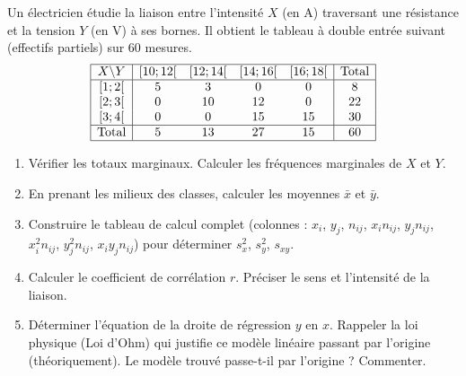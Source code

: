 \documentclass[11pt]{article}
\begin{document}
\begin{exercice}
Un électricien étudie la liaison entre l'intensité $X$ (en A) traversant une résistance et la tension $Y$ (en V) à ses bornes. Il obtient le tableau à double entrée suivant (effectifs partiels) sur 60 mesures.
\[
\begin{array}{|c|cccc|c|}\hline
X \backslash Y & [10;12[ & [12;14[ & [14;16[ & [16;18[ & \text{Total} \\ \hline
\relax [1;2[ & 5 & 3 & 0 & 0 & 8 \\
\relax [2;3[ & 0 & 10 & 12 & 0 & 22 \\
\relax [3;4[ & 0 & 0 & 15 & 15 & 30 \\ \hline
\text{Total} & 5 & 13 & 27 & 15 & 60 \\ \hline
\end{array}
\]
\begin{enumerate}
\item Vérifier les totaux marginaux. Calculer les fréquences marginales de $X$ et $Y$.
\item En prenant les milieux des classes, calculer les moyennes $\bar{x}$ et $\bar{y}$.
\item Construire le tableau de calcul complet (colonnes : $x_i$, $y_j$, $n_{ij}$, $x_i n_{ij}$, $y_j n_{ij}$, $x_i^2 n_{ij}$, $y_j^2 n_{ij}$, $x_i y_j n_{ij}$) pour déterminer $s_x^2$, $s_y^2$, $s_{xy}$.
\item Calculer le coefficient de corrélation $r$. Préciser le sens et l'intensité de la liaison.
\item Déterminer l'équation de la droite de régression $y$ en $x$. Rappeler la loi physique (Loi d'Ohm) qui justifie ce modèle linéaire passant par l'origine (théoriquement). Le modèle trouvé passe-t-il par l'origine ? Commenter.
\end{enumerate}
\end{exercice}
\end{document}
